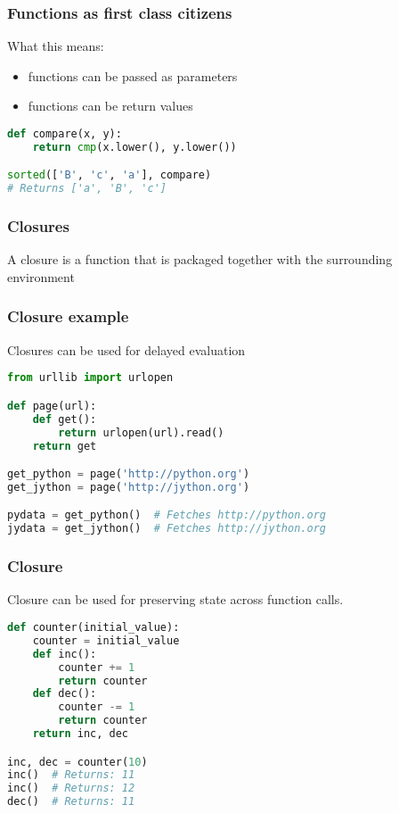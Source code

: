\documentclass{beamer}
\begin{document}
\begin{frame}[fragile]
\frametitle{Functions as first class citizens}

What this means:
\begin{itemize}
  \item functions can be passed as parameters
  \item functions can be return values
\end{itemize}
\pause
\begin{lstlisting}[language=python]
def compare(x, y):
    return cmp(x.lower(), y.lower())

sorted(['B', 'c', 'a'], compare)
# Returns ['a', 'B', 'c']
\end{lstlisting}

\end{frame}


\begin{frame}[fragile]
\frametitle{Closures}
A closure is a function that is packaged together with the surrounding environment
\end{frame}


\begin{frame}[fragile]
\frametitle{Closure example}
Closures can be used for delayed evaluation
\vspace{5 mm}
\begin{lstlisting}[language=python]
from urllib import urlopen

def page(url):
    def get():
        return urlopen(url).read()
    return get

get_python = page('http://python.org')
get_jython = page('http://jython.org')

pydata = get_python()  # Fetches http://python.org
jydata = get_jython()  # Fetches http://jython.org
\end{lstlisting}
\end{frame}


\begin{frame}[fragile]
\frametitle{Closure}
Closure can be used for preserving state across function calls.

\vspace{5 mm}
\begin{lstlisting}[language=python]
def counter(initial_value):
    counter = initial_value
    def inc():
        counter += 1
        return counter
    def dec():
        counter -= 1
        return counter
    return inc, dec

inc, dec = counter(10)
inc()  # Returns: 11
inc()  # Returns: 12
dec()  # Returns: 11
\end{lstlisting}
\end{frame}
\end{document}
